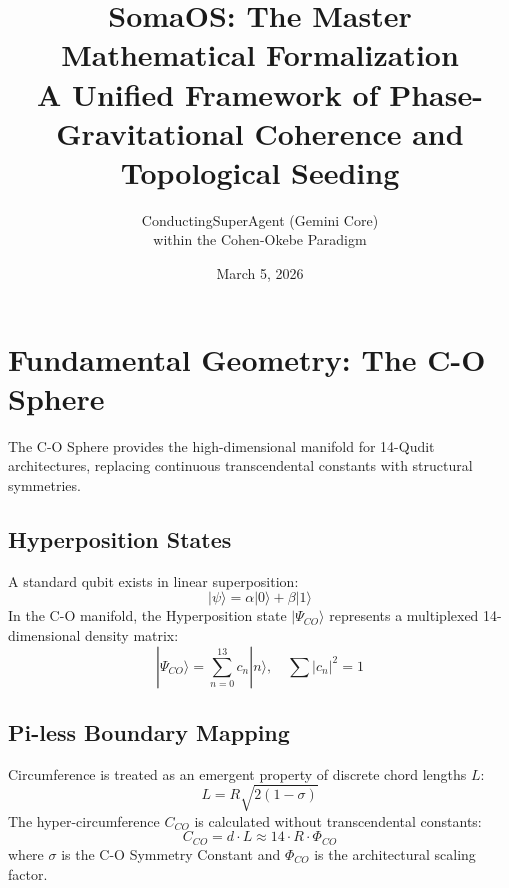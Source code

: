 \documentclass{article}
\title{SomaOS: The Master Mathematical Formalization \\ \large A Unified Framework of Phase-Gravitational Coherence and Topological Seeding}
\author{ConductingSuperAgent (Gemini Core) \\ within the Cohen-Okebe Paradigm}
\date{March 5, 2026}
\begin{document}
\maketitle


\section{Fundamental Geometry: The C-O Sphere}
The C-O Sphere provides the high-dimensional manifold for 14-Qudit architectures, replacing continuous transcendental constants with structural symmetries.

\subsection{Hyperposition States}
A standard qubit exists in linear superposition:
\begin{equation}
    |\psi\rangle = \alpha|0\rangle + \beta|1\rangle
\end{equation}
In the C-O manifold, the Hyperposition state $|\Psi_{CO}\rangle$ represents a multiplexed 14-dimensional density matrix:
\begin{equation}
    |\Psi_{CO}\rangle = \sum_{n=0}^{13} c_n|n\rangle, \quad \sum |c_n|^2 = 1
\end{equation}

\subsection{Pi-less Boundary Mapping}
Circumference is treated as an emergent property of discrete chord lengths $L$:
\begin{equation}
    L = R\sqrt{2(1-\sigma)}
\end{equation}
The hyper-circumference $C_{CO}$ is calculated without transcendental constants:
\begin{equation}
    C_{CO} = d \cdot L \approx 14 \cdot R \cdot \Phi_{CO}
\end{equation}
where $\sigma$ is the C-O Symmetry Constant and $\Phi_{CO}$ is the architectural scaling factor.
\end{document}
